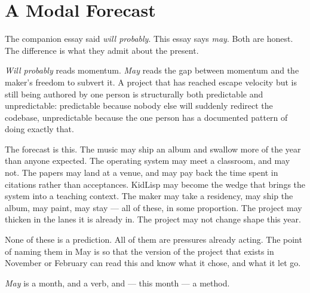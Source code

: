 \documentclass[11pt,letterpaper]{article}
\begin{document}
\section{A Modal Forecast}

The companion essay said \textit{will probably}. This essay says \textit{may}. Both are honest. The difference is what they admit about the present.

\textit{Will probably} reads momentum. \textit{May} reads the gap between momentum and the maker's freedom to subvert it. A project that has reached escape velocity but is still being authored by one person is structurally both predictable and unpredictable: predictable because nobody else will suddenly redirect the codebase, unpredictable because the one person has a documented pattern of doing exactly that.

The forecast is this. The music may ship an album and swallow more of the year than anyone expected. The operating system may meet a classroom, and may not. The papers may land at a venue, and may pay back the time spent in citations rather than acceptances. KidLisp may become the wedge that brings the system into a teaching context. The maker may take a residency, may ship the album, may paint, may stay --- all of these, in some proportion. The project may thicken in the lanes it is already in. The project may not change shape this year.

None of these is a prediction. All of them are pressures already acting. The point of naming them in May is so that the version of the project that exists in November or February can read this and know what it chose, and what it let go.

\textit{May} is a month, and a verb, and --- this month --- a method.

\end{document}
